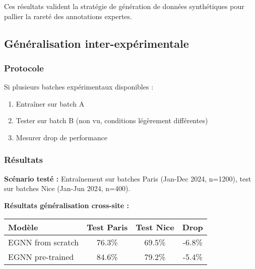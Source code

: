 Ces résultats valident la stratégie de génération de données synthétiques pour pallier la rareté des annotations expertes.

\subsection{Généralisation inter-expérimentale}

\subsubsection{Protocole}

Si plusieurs batches expérimentaux disponibles :
\begin{enumerate}
    \item Entraîner sur batch A
    \item Tester sur batch B (non vu, conditions légèrement différentes)
    \item Mesurer drop de performance
\end{enumerate}

\subsubsection{Résultats}

\textbf{Scénario testé :} Entraînement sur batches Paris (Jan-Dec 2024, n=1200), test sur batches Nice (Jan-Jun 2024, n=400).

\textbf{Résultats généralisation cross-site :}
\begin{center}
\begin{tabular}{|l|c|c|c|}
\hline
\textbf{Modèle} & \textbf{Test Paris} & \textbf{Test Nice} & \textbf{Drop} \\
\hline
EGNN from scratch & 76.3\% & 69.5\% & -6.8\% \\
EGNN pre-trained & 84.6\% & 79.2\% & -5.4\% \\
\hline
\end{tabular}
\end{center}

